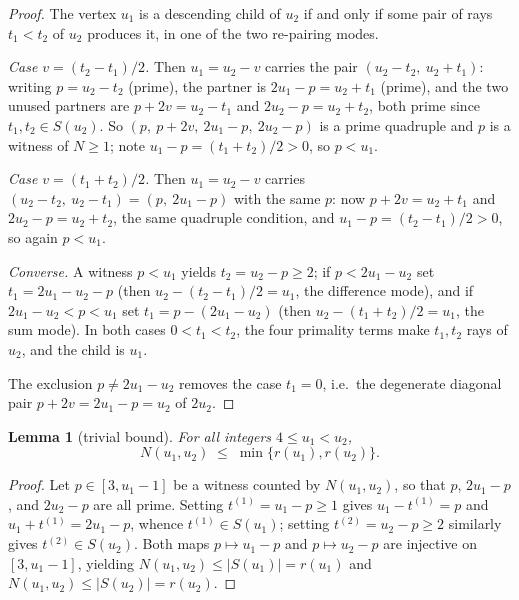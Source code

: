 \documentclass[11pt]{article}
\theoremstyle{plain}
\newtheorem{lemma}[theorem]{Lemma}
\theoremstyle{definition}
\newcommand{\rays}{S}
\newcommand{\rch}{r}
\begin{document}
\begin{proof}
The vertex $u_1$ is a descending child of $u_2$ if and only if
some pair of
rays $t_1 < t_2$ of $u_2$ produces it, in one of the two re-pairing
modes.

\emph{Case $v = (t_2 - t_1)/2$.} Then $u_1 = u_2 - v$ carries the
pair $(u_2 - t_2,\ u_2 + t_1)$: writing $p = u_2 - t_2$ (prime), the
partner is $2u_1 - p = u_2 + t_1$ (prime), and the two unused
partners are $p + 2v = u_2 - t_1$ and $2u_2 - p = u_2 + t_2$, both
prime since $t_1,t_2 \in \rays(u_2)$. So
$(p,\ p+2v,\ 2u_1-p,\ 2u_2-p)$ is a prime quadruple and $p$ is a
witness of $N \ge 1$; note $u_1 - p = (t_1 + t_2)/2 > 0$, so
$p < u_1$.

\emph{Case $v = (t_1 + t_2)/2$.} Then $u_1 = u_2 - v$ carries
$(u_2 - t_2,\ u_2 - t_1) = (p,\ 2u_1 - p)$ with the same $p$: now
$p + 2v = u_2 + t_1$ and $2u_2 - p = u_2 + t_2$, the same
quadruple condition, and $u_1 - p = (t_2 - t_1)/2 > 0$, so again
$p < u_1$.

\emph{Converse.} A witness $p < u_1$ yields
$t_2 = u_2 - p \ge 2$; if $p < 2u_1 - u_2$ set
$t_1 = 2u_1 - u_2 - p$ (then $u_2 - (t_2 - t_1)/2 = u_1$, the
difference mode), and if $2u_1 - u_2 < p < u_1$ set
$t_1 = p - (2u_1 - u_2)$ (then $u_2 - (t_1 + t_2)/2 = u_1$, the sum
mode). In both cases $0 < t_1 < t_2$, the four primality terms make
$t_1, t_2$ rays of $u_2$, and the child is $u_1$.

The exclusion $p \neq 2u_1 - u_2$ removes the case $t_1 = 0$,
i.e.\ the degenerate diagonal pair $p + 2v = 2u_1 - p = u_2$ of
$2u_2$.
\end{proof}

\begin{lemma}[trivial bound]\label{lem:bound}
For all integers $4 \le u_1 < u_2$,
\[
N(u_1,u_2) \;\le\; \min\{\rch(u_1),\rch(u_2)\}.
\]
\end{lemma}

\begin{proof}
Let $p \in [3, u_1 - 1]$ be a witness counted by $N(u_1,u_2)$, so
that $p$, $2u_1 - p$, and $2u_2 - p$ are all prime. Setting
$t^{(1)} = u_1 - p \ge 1$ gives $u_1 - t^{(1)} = p$ and
$u_1 + t^{(1)} = 2u_1 - p$, whence $t^{(1)} \in \rays(u_1)$; setting
$t^{(2)} = u_2 - p \ge 2$ similarly gives
$t^{(2)} \in \rays(u_2)$. Both maps $p \mapsto u_1 - p$ and
$p \mapsto u_2 - p$ are injective on $[3, u_1 - 1]$, yielding
$N(u_1,u_2) \le |\rays(u_1)| = \rch(u_1)$ and
$N(u_1,u_2) \le |\rays(u_2)| = \rch(u_2)$.
\end{proof}
\end{document}
